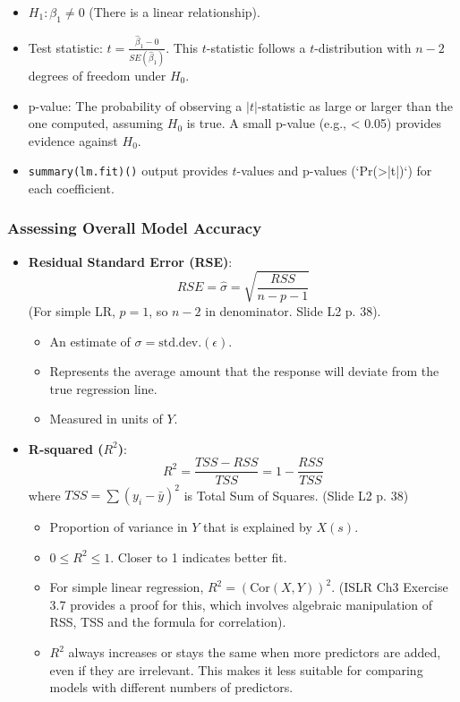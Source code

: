 \documentclass[12pt,a4paper]{article}
\newcommand{\Rfunction}[1]{\texttt{#1()}} %
\begin{document}
\begin{itemize}
\begin{itemize}
\begin{itemize}
                    \item $H_1: \beta_1 \neq 0$ (There is a linear relationship).
                    \item Test statistic: $t = \frac{\hat{\beta}_1 - 0}{SE(\hat{\beta}_1)}$. This $t$-statistic follows a $t$-distribution with $n-2$ degrees of freedom under $H_0$.
                    \item p-value: The probability of observing a $|t|$-statistic as large or larger than the one computed, assuming $H_0$ is true. A small p-value (e.g., < 0.05) provides evidence against $H_0$.
                    \item \Rfunction{summary(lm.fit)} output provides $t$-values and p-values (`Pr(>|t|)`) for each coefficient.
                \end{itemize}
        \end{itemize}

    \subsubsection{Assessing Overall Model Accuracy }
        \begin{itemize}
            \item \textbf{Residual Standard Error (RSE)}:
                $$ RSE = \hat{\sigma} = \sqrt{\frac{RSS}{n-p-1}} $$
                (For simple LR, $p=1$, so $n-2$ in denominator. Slide L2 p. 38).
                \begin{itemize}
                    \item An estimate of $\sigma = \text{std.dev.}(\epsilon)$.
                    \item Represents the average amount that the response will deviate from the true regression line.
                    \item Measured in units of $Y$.
                \end{itemize}
            \item \textbf{R-squared ($R^2$)}:
                $$ R^2 = \frac{TSS - RSS}{TSS} = 1 - \frac{RSS}{TSS} $$
                where $TSS = \sum (y_i - \bar{y})^2$ is Total Sum of Squares. (Slide L2 p. 38)
                \begin{itemize}
                    \item Proportion of variance in $Y$ that is explained by $X(s)$.
                    \item $0 \le R^2 \le 1$. Closer to 1 indicates better fit.
                    \item For simple linear regression, $R^2 = (\text{Cor}(X,Y))^2$. (ISLR Ch3 Exercise 3.7 provides a proof for this, which involves algebraic manipulation of RSS, TSS and the formula for correlation).
                    \item $R^2$ always increases or stays the same when more predictors are added, even if they are irrelevant. This makes it less suitable for comparing models with different numbers of predictors.
                \end{itemize}
        \end{itemize}


\end{itemize}
\end{document}
